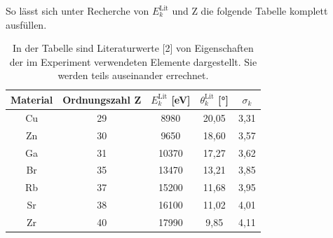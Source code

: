 \documentclass[titlepage = firstcover]{scrartcl}
\begin{document}
        \noindent
        So lässt sich unter Recherche von $E_k^{\text{Lit}}$ und Z die folgende Tabelle komplett ausfüllen.
        \FloatBarrier
        \begin{table}[h]
          \centering
          \caption{In der Tabelle sind Literaturwerte [2] von Eigenschaften der im Experiment verwendeten Elemente dargestellt. Sie werden teils auseinander errechnet.}
          \label{tab:Elemente}
        
          \begin{tabular}{c c c c c}
            \toprule
            {Material}  & {Ordnungszahl Z } & {$E_k^{\text{Lit}}$ [eV]} & {$\theta_k^{\text{Lit}}$ [°]} & {$\sigma_k$} \\ 
            \midrule
            Cu	                &   29           &  8980          &  20,05     &    3,31   \\
            Zn	                &   30           &  9650          &  18,60     &    3,57   \\
            Ga	                &   31           &  10370         &  17,27     &    3,62   \\
            Br	                &   35           &  13470         &  13,21     &    3,85   \\
            Rb	                &   37           &  15200         &  11,68     &    3,95   \\
            Sr	                &   38           &  16100         &  11,02     &    4,01   \\
            Zr	                &   40           &  17990         &  9,85      &    4,11   \\
            \bottomrule
          \end{tabular}
        \end{table}
  
        \FloatBarrier
        \newpage
\end{document}
